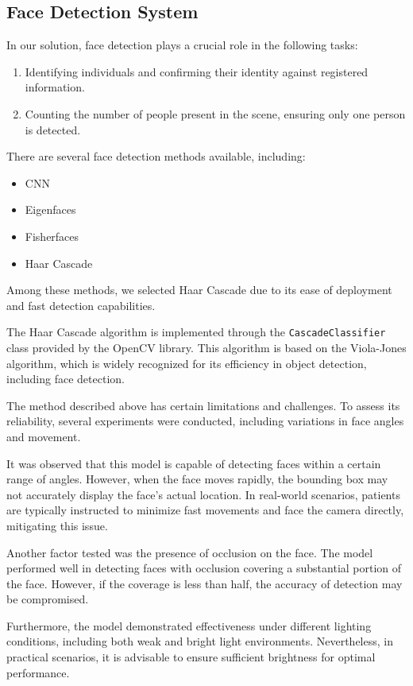 \documentclass{article}
\begin{document}
\subsection{Face Detection System}
In our solution, face detection plays a crucial role in the following tasks:

\begin{enumerate}
  \item Identifying individuals and confirming their identity against registered information.
  \item Counting the number of people present in the scene, ensuring only one person is detected.
\end{enumerate}

There are several face detection methods available, including:
\begin{itemize}
    \item CNN
    \item Eigenfaces
    \item Fisherfaces
    \item Haar Cascade
\end{itemize}
Among these methods, we selected Haar Cascade due to its ease of deployment and fast detection capabilities.

The Haar Cascade algorithm is implemented through the \texttt{CascadeClassifier} class provided by the OpenCV library. This algorithm is based on the Viola-Jones algorithm, which is widely recognized for its efficiency in object detection, including face detection.

The method described above has certain limitations and challenges. To assess its reliability, several experiments were conducted, including variations in face angles and movement.

It was observed that this model is capable of detecting faces within a certain range of angles. However, when the face moves rapidly, the bounding box may not accurately display the face's actual location. In real-world scenarios, patients are typically instructed to minimize fast movements and face the camera directly, mitigating this issue.

Another factor tested was the presence of occlusion on the face. The model performed well in detecting faces with occlusion covering a substantial portion of the face. However, if the coverage is less than half, the accuracy of detection may be compromised.

Furthermore, the model demonstrated effectiveness under different lighting conditions, including both weak and bright light environments. Nevertheless, in practical scenarios, it is advisable to ensure sufficient brightness for optimal performance.
\end{document}
